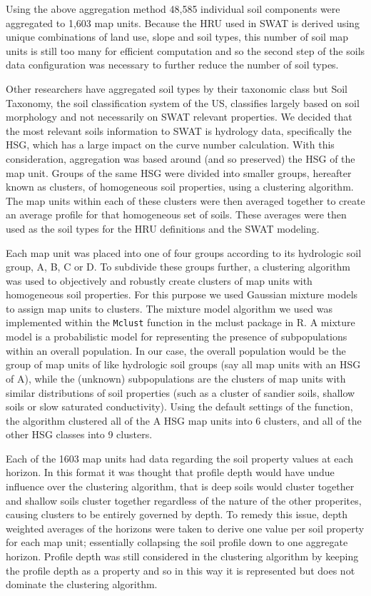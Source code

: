 Using the above aggregation method 48,585 individual soil components were
aggregated to 1,603 map units. Because the HRU used in
SWAT is derived using unique combinations of land use, slope and soil types,
this number of soil map units is still too many for efficient computation  and so
the second step of the soils data configuration was necessary to further reduce
the number of soil types. %

Other researchers have aggregated soil types by their taxonomic class
\citep{gatzke_aggregation_2011} but Soil Taxonomy, the soil classification
system of the US, classifies largely based on soil morphology and not
necessarily on SWAT relevant properties. We decided that the most relevant soils
information to SWAT is hydrology data, specifically the HSG, which has a large impact on the curve number calculation. With this
consideration, aggregation was based around (and so preserved) the HSG of the
map unit. Groups of the same HSG were divided into smaller groups, hereafter
known as clusters, of homogeneous soil properties, using a clustering algorithm.
The map units within each of these clusters were then averaged together to create
an average profile for that homogeneous set of soils. These averages were then
used as the soil types for the HRU definitions and the SWAT modeling.

Each map unit was placed into one of four groups according to its hydrologic soil
group, A, B, C or D. To subdivide these groups further, a clustering algorithm
was used to objectively and robustly create clusters of map units with
homogeneous soil properties. For this purpose we used Gaussian mixture models to
assign map units to clusters. The mixture model algorithm we used was implemented within the
\texttt{Mclust} function in the mclust package \citep{fraley_mclust_2012} in R.
A mixture model is a probabilistic model for representing the presence of
subpopulations within an overall population. In our case, the overall population
would be the group of map units of like hydrologic soil groups (say all map units
with an HSG of A), while the (unknown) subpopulations are the clusters of
map units with similar distributions of soil properties (such as a cluster of
sandier soils, shallow soils or slow saturated conductivity). Using the default
settings of the function, the algorithm clustered all of the A HSG map units into
6 clusters, and all of the other HSG classes into 9 clusters.

Each of the 1603 map units had data regarding the soil property values at each
horizon. In this format it was thought that profile depth would have undue influence over the clustering algorithm, that is deep soils would cluster together and shallow soils cluster together regardless of the nature of the other properites, causing clusters to be entirely governed by
depth. To remedy this issue, depth weighted averages of the horizons were taken
to derive one value per soil property for each map unit; essentially collapsing
the soil profile down to one aggregate horizon. Profile depth was still
considered in the clustering algorithm by keeping the profile depth as a
property and so in this way it is represented but does not dominate the clustering
algorithm.

